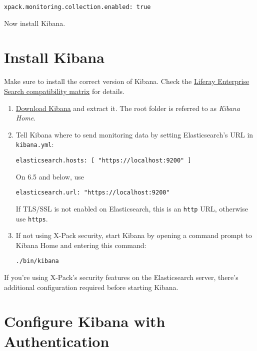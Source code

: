 \begin{verbatim}
xpack.monitoring.collection.enabled: true
\end{verbatim}

Now install Kibana.

\section{Install Kibana}\label{install-kibana}

Make sure to install the correct version of Kibana. Check the
\href{https://help.liferay.com/hc/en-us/articles/360016511651\#Liferay-Enterprise-Search}{Liferay
Enterprise Search compatibility matrix} for details.

\begin{enumerate}
\def\labelenumi{\arabic{enumi}.}
\item
  \href{https://www.elastic.co/downloads/kibana}{Download Kibana} and
  extract it. The root folder is referred to as \emph{Kibana Home}.
\item
  Tell Kibana where to send monitoring data by setting Elasticsearch's
  URL in \texttt{kibana.yml}:

\begin{verbatim}
elasticsearch.hosts: [ "https://localhost:9200" ]
\end{verbatim}

  On 6.5 and below, use

\begin{verbatim}
elasticsearch.url: "https://localhost:9200"
\end{verbatim}

  If TLS/SSL is not enabled on Elasticsearch, this is an \texttt{http}
  URL, otherwise use \texttt{https}.
\item
  If not using X-Pack security, start Kibana by opening a command prompt
  to Kibana Home and entering this command:

\begin{verbatim}
./bin/kibana
\end{verbatim}
\end{enumerate}

If you're using X-Pack's security features on the Elasticsearch server,
there's additional configuration required before starting Kibana.

\section{Configure Kibana with
Authentication}\label{configure-kibana-with-authentication}

